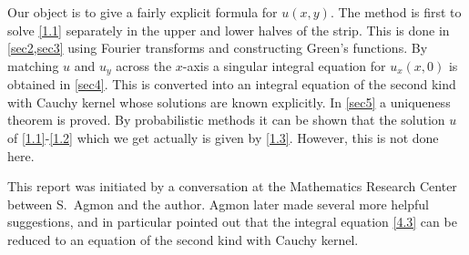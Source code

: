 \documentclass[leqno]{article}
\numberwithin{equation}{section}
\theoremstyle{plain}
\begin{document}
Our object is to give a fairly explicit formula for $u(x,y)$.
The method is first to solve \eqref{1.1} separately in the upper and lower halves of the strip.
This is done in \cref{sec2,sec3} using Fourier transforms and constructing Green's functions.
By matching $u$ and $u_y$ across the $x$-axis a singular integral equation for $u_x(x,0)$ is obtained in \cref{sec4}.
This is converted into an integral equation of the second kind with Cauchy kernel whose solutions are known explicitly.
In \cref{sec5} a uniqueness theorem is proved. 
By probabilistic methods it can be shown that the solution $u$ of \eqref{1.1}-\eqref{1.2} which we get actually is given by \eqref{1.3}.
However, this is not done here.

This report was initiated by a conversation at the Mathematics Research Center between S.\ Agmon and the author.
Agmon later made several more helpful suggestions, and in particular pointed out that the integral equation \eqref{4.3} can be reduced to an equation of the second kind with Cauchy kernel.

\section{}
\label{sec2}
\end{document}

